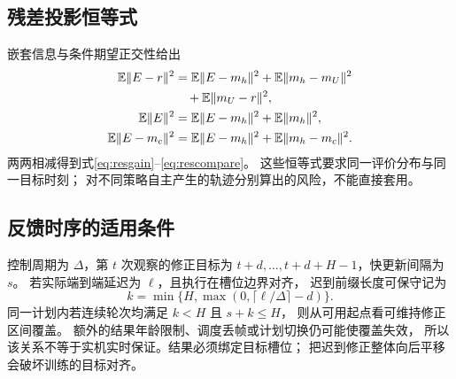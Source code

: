 \subsection{残差投影恒等式}
嵌套信息与条件期望正交性给出
\begin{align*}
 \mathbb E\lVert E-r\rVert^2
 &=\mathbb E\lVert E-m_h\rVert^2+\mathbb E\lVert m_h-m_U\rVert^2\\
 &\quad+\mathbb E\lVert m_U-r\rVert^2,\\
 \mathbb E\lVert E\rVert^2
 &=\mathbb E\lVert E-m_h\rVert^2+\mathbb E\lVert m_h\rVert^2,\\
 \mathbb E\lVert E-m_c\rVert^2
 &=\mathbb E\lVert E-m_h\rVert^2+\mathbb E\lVert m_h-m_c\rVert^2.
\end{align*}
两两相减得到式\eqref{eq:resgain}--\eqref{eq:rescompare}。
这些恒等式要求同一评价分布与同一目标时刻；
对不同策略自主产生的轨迹分别算出的风险，不能直接套用。

\subsection{反馈时序的适用条件}
控制周期为 $\Delta$，第 $t$ 次观察的修正目标为
$t+d,\ldots,t+d+H-1$，快更新间隔为 $s$。
若实际端到端延迟为 $\ell$，且执行在槽位边界对齐，
迟到前缀长度可保守记为
\[
 k=\min\{H,\max(0,\lceil\ell/\Delta\rceil-d)\}.
\]
同一计划内若连续轮次均满足 $k<H$ 且 $s+k\le H$，
则从可用起点看可维持修正区间覆盖。
额外的结果年龄限制、调度丢帧或计划切换仍可能使覆盖失效，
所以该关系不等于实机实时保证。结果必须绑定目标槽位；
把迟到修正整体向后平移会破坏训练的目标对齐。

